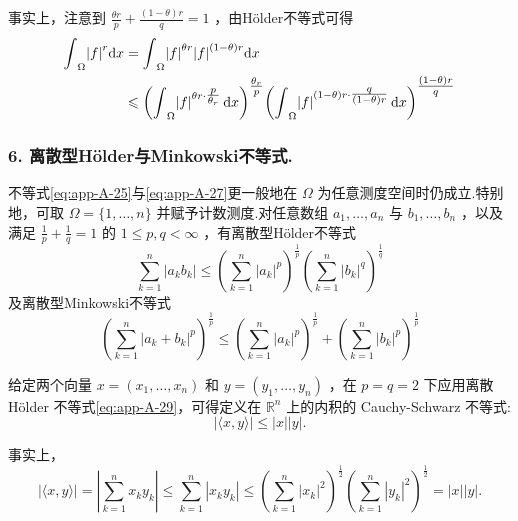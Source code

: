 事实上，注意到 $\frac{\theta r}{p} + \frac{\left( {1 - \theta }\right) r}{q} = 1$ ，由Hölder不等式可得
\begin{align*}
    {\int }_{\Omega }{\left| f\right| }^{r}{\mathop{}\!\mathrm{d} x} &= {\int }_{\Omega }{\left| f\right| }^{\theta r}{\left| f\right| }^{\left( {1 - \theta }\right) r}{\mathop{}\!\mathrm{d} x}\\
    &\leqslant  {\left( {\int }_{\Omega }{\left| f\right| }^{{\theta r} \cdot  \tfrac{p}{{\theta }_{r}}}\mathop{}\!\mathrm{d}x\right) }^{\tfrac{{\theta }_{r}}{p}}{\left( {\int }_{\Omega }{\left| f\right| }^{\left( {1 - \theta }\right) r \cdot  \tfrac{q}{\left( {1 - \theta }\right) r}}\mathop{}\!\mathrm{d} x\right) }^{\tfrac{\left( {1 - \theta }\right) r}{q}}
\end{align*}


\subsubsection*{6. 离散型Hölder与Minkowski不等式.}不等式\eqref{eq:app-A-25}与\eqref{eq:app-A-27}更一般地在 $\Omega$ 为任意测度空间时仍成立.特别地，可取 $\Omega  = \{ 1,\ldots ,n\}$ 并赋予计数测度.对任意数组 ${a}_{1},\ldots ,{a}_{n}$ 与 ${b}_{1},\ldots ,{b}_{n}$ ，以及满足 $\frac{1}{p} + \frac{1}{q} = 1$ 的 $1 \leq  p,q < \infty$ ，有离散型Hölder不等式
\begin{equation}\tag{A.29}\label{eq:app-A-29}
\sum_{{k = 1}}^{n}\left| {{a}_{k}{b}_{k}}\right|  \leq  {\left( \sum_{{k = 1}}^{n}{\left| {a}_{k}\right| }^{p}\right) }^{\frac{1}{p}}{\left( \sum_{{k = 1}}^{n}{\left| {b}_{k}\right| }^{q}\right) }^{\frac{1}{q}}
\end{equation}
及离散型Minkowski不等式
\begin{equation}\tag{A.30}\label{eq:app-A-30}
{\left( \sum_{{k = 1}}^{n}{\left| {a}_{k} + {b}_{k}\right| }^{p}\right) }^{\frac{1}{p}} \leq  {\left( \sum_{{k = 1}}^{n}{\left| {a}_{k}\right| }^{p}\right) }^{\frac{1}{p}} + {\left( \sum_{{k = 1}}^{n}{\left| {b}_{k}\right| }^{p}\right) }^{\frac{1}{p}}
\end{equation}

给定两个向量 $x = \left( {{x}_{1},\ldots ,{x}_{n}}\right)$ 和 $y = \left( {{y}_{1},\ldots ,{y}_{n}}\right)$ ，在 $p = q = 2$ 下应用离散 Hölder 不等式\eqref{eq:app-A-29}，可得定义在 ${\mathbb{R}}^{n}$ 上的内积的 Cauchy-Schwarz 不等式:
\begin{equation}\tag{A.31}\label{eq:app-A-31}
\left| {\langle x,y\rangle }\right|  \leq  \left| x\right| \left| y\right| .
\end{equation}

事实上，
\[
\left| {\langle x,y\rangle }\right|  = \left| {\sum_{{k = 1}}^{n}{x}_{k}{y}_{k}}\right|  \leq  \sum_{{k = 1}}^{n}\left| {{x}_{k}{y}_{k}}\right|  \leq  {\left( \sum_{{k = 1}}^{n}{\left| {x}_{k}\right| }^{2}\right) }^{\frac{1}{2}}{\left( \sum_{{k = 1}}^{n}{\left| {y}_{k}\right| }^{2}\right) }^{\frac{1}{2}} = \left| x\right| \left| y\right| .
\]

